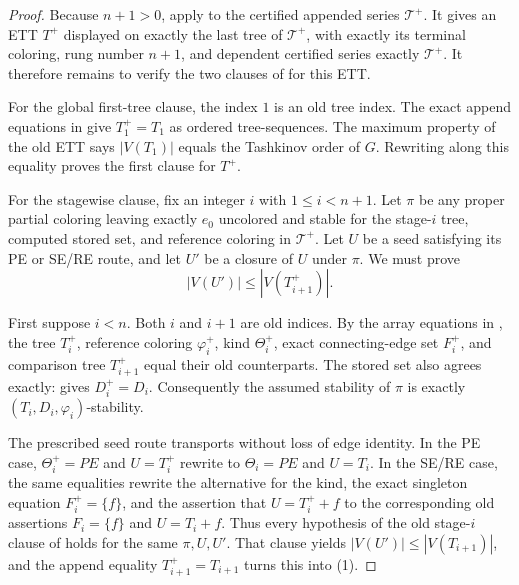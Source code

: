 \begin{proof}
Because \(n+1>0\), apply
 to the certified appended series
\(\mathcal T^+\).  It gives an ETT \(T^+\) displayed on exactly the last
tree of \(\mathcal T^+\), with exactly its terminal coloring, rung number
\(n+1\), and dependent certified series exactly \(\mathcal T^+\).  It
therefore remains to verify the two clauses of
 for this ETT.

For the global first-tree clause, the index \(1\) is an old tree index.
The exact append equations in  give
\(T_1^+=T_1\) as ordered tree-sequences.  The maximum property of the old
ETT says \(|V(T_1)|\) equals the Tashkinov order of \(G\).  Rewriting along
this equality proves the first clause for \(T^+\).

For the stagewise clause, fix an integer \(i\) with
\(1\leq i<n+1\).  Let \(\pi\) be any proper partial coloring leaving
exactly \(e_0\) uncolored and stable for the stage-\(i\) tree, computed
stored set, and reference coloring in \(\mathcal T^+\).  Let \(U\) be a
seed satisfying its PE or SE/RE route, and let \(U'\) be a closure of \(U\)
under \(\pi\).  We must prove
\[
                         |V(U')|\leq |V(T_{i+1}^+)|.       \tag{1}
\]

First suppose \(i<n\).  Both \(i\) and \(i+1\) are old indices.  By the
array equations in , the tree \(T_i^+\),
reference coloring \(\varphi_i^+\), kind \(\Theta_i^+\), exact
connecting-edge set \(F_i^+\), and comparison tree \(T_{i+1}^+\) equal
their old counterparts.  The stored set also agrees exactly:
 gives \(D_i^+=D_i\).  Consequently
the assumed stability of \(\pi\) is exactly
\((T_i,D_i,\varphi_i)\)-stability.

The prescribed seed route transports without loss of edge identity.  In
the PE case, \(\Theta_i^+=PE\) and \(U=T_i^+\) rewrite to
\(\Theta_i=PE\) and \(U=T_i\).  In the SE/RE case, the same equalities
rewrite the alternative for the kind, the exact singleton equation
\(F_i^+=\{f\}\), and the assertion that \(U=T_i^++f\) to the corresponding
old assertions \(F_i=\{f\}\) and \(U=T_i+f\).  Thus every hypothesis of
the old stage-\(i\) clause of  holds for the same
\(\pi,U,U'\).  That clause yields
\(|V(U')|\leq|V(T_{i+1})|\), and the append equality
\(T_{i+1}^+=T_{i+1}\) turns this into (1).


\end{proof}
